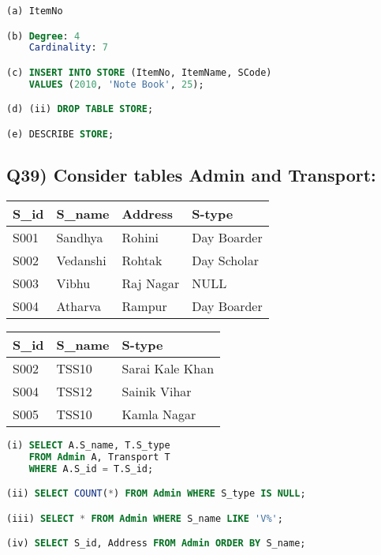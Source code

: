 \documentclass{article}
\begin{document}
\begin{lstlisting}[language=SQL]
(a) ItemNo

(b) Degree: 4
    Cardinality: 7

(c) INSERT INTO STORE (ItemNo, ItemName, SCode) 
    VALUES (2010, 'Note Book', 25);

(d) (ii) DROP TABLE STORE;

(e) DESCRIBE STORE;
\end{lstlisting}

\subsection*{Q39) Consider tables Admin and Transport:}

\begin{tabular}{|l|l|l|l|}
\hline
S\_id & S\_name & Address & S-type \\
\hline
S001 & Sandhya & Rohini & Day Boarder \\
S002 & Vedanshi & Rohtak & Day Scholar \\
S003 & Vibhu & Raj Nagar & NULL \\
S004 & Atharva & Rampur & Day Boarder \\
\hline
\end{tabular}

\begin{tabular}{|l|l|l|}
\hline
S\_id & S\_name & S-type \\
\hline
S002 & TSS10 & Sarai Kale Khan \\
S004 & TSS12 & Sainik Vihar \\
S005 & TSS10 & Kamla Nagar \\
\hline
\end{tabular}

\begin{lstlisting}[language=SQL]
(i) SELECT A.S_name, T.S_type 
    FROM Admin A, Transport T 
    WHERE A.S_id = T.S_id;

(ii) SELECT COUNT(*) FROM Admin WHERE S_type IS NULL;

(iii) SELECT * FROM Admin WHERE S_name LIKE 'V%';

(iv) SELECT S_id, Address FROM Admin ORDER BY S_name;
\end{lstlisting}
\end{document}
